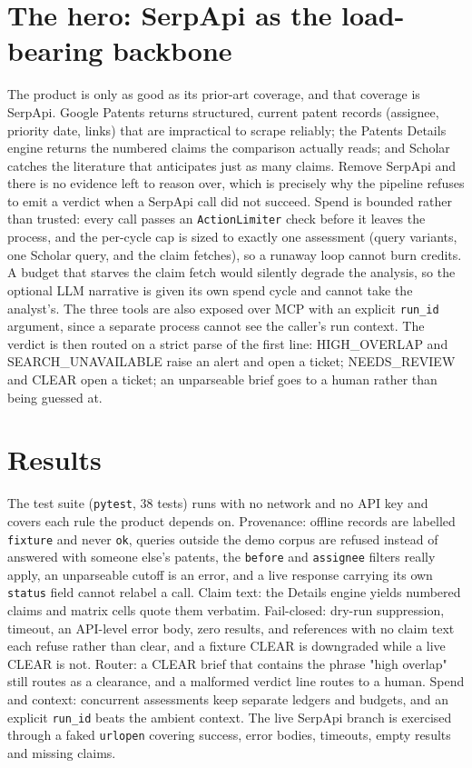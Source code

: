 \documentclass[12pt]{article}
\begin{document}
\section{The hero: SerpApi as the load-bearing backbone}
The product is only as good as its prior-art coverage, and that coverage is
SerpApi. Google Patents returns structured, current patent records (assignee,
priority date, links) that are impractical to scrape reliably; the Patents
Details engine returns the numbered claims the comparison actually reads; and
Scholar catches the literature that anticipates just as many claims. Remove
SerpApi and there is no evidence left to reason over, which is precisely why the
pipeline refuses to emit a verdict when a SerpApi call did not succeed. Spend is
bounded rather than trusted: every call passes an \texttt{ActionLimiter} check
before it leaves the process, and the per-cycle cap is sized to exactly one
assessment (query variants, one Scholar query, and the claim fetches), so a
runaway loop cannot burn credits. A budget that starves the claim fetch would
silently degrade the analysis, so the optional LLM narrative is given its own
spend cycle and cannot take the analyst's. The three tools are also exposed over
MCP with an explicit \texttt{run\_id} argument, since a separate process cannot
see the caller's run context. The verdict is then routed on a strict parse of the
first line: HIGH\_OVERLAP and SEARCH\_UNAVAILABLE raise an alert and open a
ticket; NEEDS\_REVIEW and CLEAR open a ticket; an unparseable brief goes to a
human rather than being guessed at.

\section{Results}
The test suite (\texttt{pytest}, 38 tests) runs with no network and no API key
and covers each rule the product depends on. Provenance: offline records are
labelled \texttt{fixture} and never \texttt{ok}, queries outside the demo corpus
are refused instead of answered with someone else's patents, the \texttt{before}
and \texttt{assignee} filters really apply, an unparseable cutoff is an error,
and a live response carrying its own \texttt{status} field cannot relabel a call.
Claim text: the Details engine yields numbered claims and matrix cells quote them
verbatim. Fail-closed: dry-run suppression, timeout, an API-level error body,
zero results, and references with no claim text each refuse rather than clear,
and a fixture CLEAR is downgraded while a live CLEAR is not. Router: a CLEAR
brief that contains the phrase "high overlap" still routes as a clearance, and a
malformed verdict line routes to a human. Spend and context: concurrent
assessments keep separate ledgers and budgets, and an explicit \texttt{run\_id}
beats the ambient context. The live SerpApi branch is exercised through a faked
\texttt{urlopen} covering success, error bodies, timeouts, empty results and
missing claims.
\end{document}
